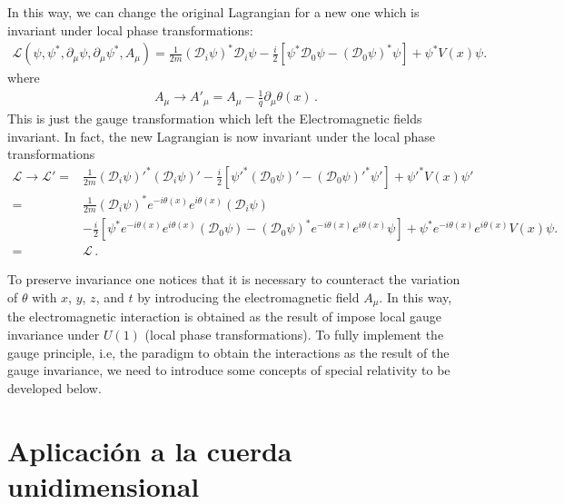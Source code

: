 In this way, we can change the original Lagrangian for a new one which is invariant under local phase transformations:
\begin{align}
   \mathcal{L}(\psi,\psi^*,\partial_\mu\psi,\partial_\mu\psi^*,A_\mu)
=\frac{1}{2m}\left(\mathcal{D}_i\psi\right)^*\mathcal{D}_i\psi-\frac{i}{2}
  \left[\psi^*\mathcal{D}_0\psi-\left(\mathcal{D}_0\psi\right)^*\psi\right]+\psi^*V(x)\psi.
\end{align}
where
\begin{align}
\label{eq:167qft}
  A_\mu\to A'_\mu=A_\mu-\frac{1}{q}\partial_\mu\theta(x)\,.
\end{align}
This is just the gauge transformation which left the Electromagnetic fields invariant. In fact, the new Lagrangian is now invariant under the local phase transformations
\begin{align}
  \mathcal{L}\to \mathcal{L}'=&
\frac{1}{2m}{\left(\mathcal{D}_i\psi\right)'}^*\left(\mathcal{D}_i\psi\right)'
-\frac{i}{2}\left[{\psi'}^*\left(\mathcal{D}_0\psi\right)'-{\left(\mathcal{D}_0\psi\right)'}^*\psi'\right]+{\psi'}^*V(x)\psi'\nonumber\\
=&
\frac{1}{2m}{\left(\mathcal{D}_i\psi\right)}^*e^{-i\theta(x)}e^{i\theta(x)}\left(\mathcal{D}_i\psi\right)\nonumber\\
&-\frac{i}{2}\left[{\psi}^*e^{-i\theta(x)}e^{i\theta(x)}\left(\mathcal{D}_0\psi\right)
-{\left(\mathcal{D}_0\psi\right)}^*e^{-i\theta(x)}e^{i\theta(x)}\psi\right]+{\psi}^*e^{-i\theta(x)}e^{i\theta(x)}V(x)\psi.\nonumber\\
=&\mathcal{L}\,.
\end{align}

To preserve invariance one notices that it is necessary to counteract the variation of $\theta$ with $x$, $y$, $z$, and $t$ by introducing the electromagnetic field $A_\mu$. In this way, the electromagnetic interaction is obtained as the result of impose local gauge invariance under $U(1)$ (local phase transformations). To fully implement the gauge principle, i.e, the paradigm to obtain the interactions as the result of the gauge invariance, we need to introduce some concepts of special relativity to be developed below.




\section{Aplicaci\'on a la cuerda unidimensional}
\label{sec:aplicacion-la-cuerda}

